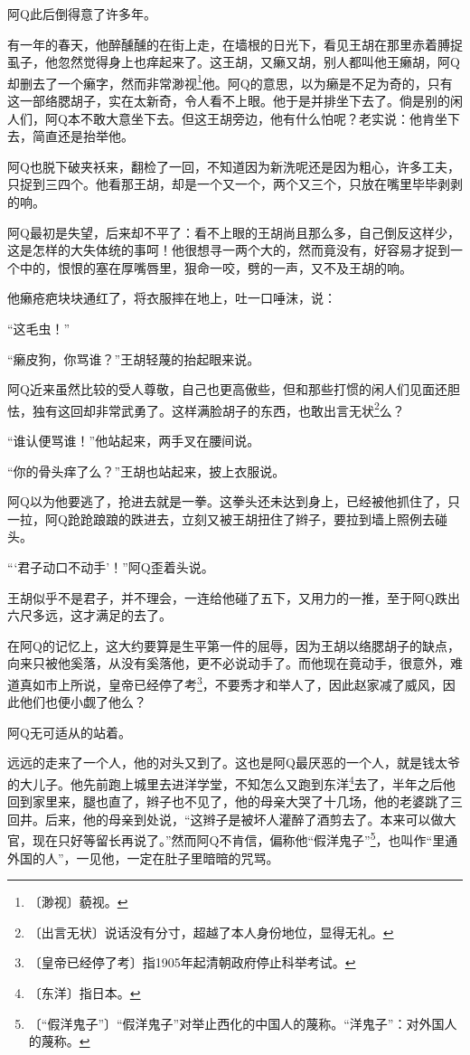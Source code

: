 \documentclass[12pt,UTF-8,openany]{ctexbook}
\begin{document}
\begin{normalsize}
    阿Q此后倒得意了许多年。
    
    有一年的春天，他醉醺醺的在街上走，在墙根的日光下，看见王胡在那里赤着膊捉虱子，他忽然觉得身上也痒起来了。这王胡，又癞又胡，别人都叫他王癞胡，阿Q却删去了一个癞字，然而非常渺视\footnote{〔渺视〕藐视。}他。阿Q的意思，以为癞是不足为奇的，只有这一部络腮胡子，实在太新奇，令人看不上眼。他于是并排坐下去了。倘是别的闲人们，阿Q本不敢大意坐下去。但这王胡旁边，他有什么怕呢？老实说：他肯坐下去，简直还是抬举他。
    
    阿Q也脱下破夹袄来，翻检了一回，不知道因为新洗呢还是因为粗心，许多工夫，只捉到三四个。他看那王胡，却是一个又一个，两个又三个，只放在嘴里毕毕剥剥的响。
    
    阿Q最初是失望，后来却不平了：看不上眼的王胡尚且那么多，自己倒反这样少，这是怎样的大失体统的事呵！他很想寻一两个大的，然而竟没有，好容易才捉到一个中的，恨恨的塞在厚嘴唇里，狠命一咬，劈的一声，又不及王胡的响。
    
    他癞疮疤块块通红了，将衣服摔在地上，吐一口唾沫，说：
    
    “这毛虫！”
    
    “癞皮狗，你骂谁？”王胡轻蔑的抬起眼来说。
    
    阿Q近来虽然比较的受人尊敬，自己也更高傲些，但和那些打惯的闲人们见面还胆怯，独有这回却非常武勇了。这样满脸胡子的东西，也敢出言无状\footnote{〔出言无状〕说话没有分寸，超越了本人身份地位，显得无礼。}么？
    
    “谁认便骂谁！”他站起来，两手叉在腰间说。
    
    “你的骨头痒了么？”王胡也站起来，披上衣服说。
    
    阿Q以为他要逃了，抢进去就是一拳。这拳头还未达到身上，已经被他抓住了，只一拉，阿Q跄跄踉踉的跌进去，立刻又被王胡扭住了辫子，要拉到墙上照例去碰头。
    
    “‘君子动口不动手’！”阿Q歪着头说。
    
    王胡似乎不是君子，并不理会，一连给他碰了五下，又用力的一推，至于阿Q跌出六尺多远，这才满足的去了。
    
    在阿Q的记忆上，这大约要算是生平第一件的屈辱，因为王胡以络腮胡子的缺点，向来只被他奚落，从没有奚落他，更不必说动手了。而他现在竟动手，很意外，难道真如市上所说，皇帝已经停了考\footnote{〔皇帝已经停了考〕指1905年起清朝政府停止科举考试。}，不要秀才和举人了，因此赵家减了威风，因此他们也便小觑了他么？
    
    阿Q无可适从的站着。
    
    远远的走来了一个人，他的对头又到了。这也是阿Q最厌恶的一个人，就是钱太爷的大儿子。他先前跑上城里去进洋学堂，不知怎么又跑到东洋\footnote{〔东洋〕指日本。}去了，半年之后他回到家里来，腿也直了，辫子也不见了，他的母亲大哭了十几场，他的老婆跳了三回井。后来，他的母亲到处说，“这辫子是被坏人灌醉了酒剪去了。本来可以做大官，现在只好等留长再说了。”然而阿Q不肯信，偏称他“假洋鬼子”\footnote{〔“假洋鬼子”〕“假洋鬼子”对举止西化的中国人的蔑称。“洋鬼子”：对外国人的蔑称。}，也叫作“里通外国的人”，一见他，一定在肚子里暗暗的咒骂。
    

\end{normalsize}
\end{document}

